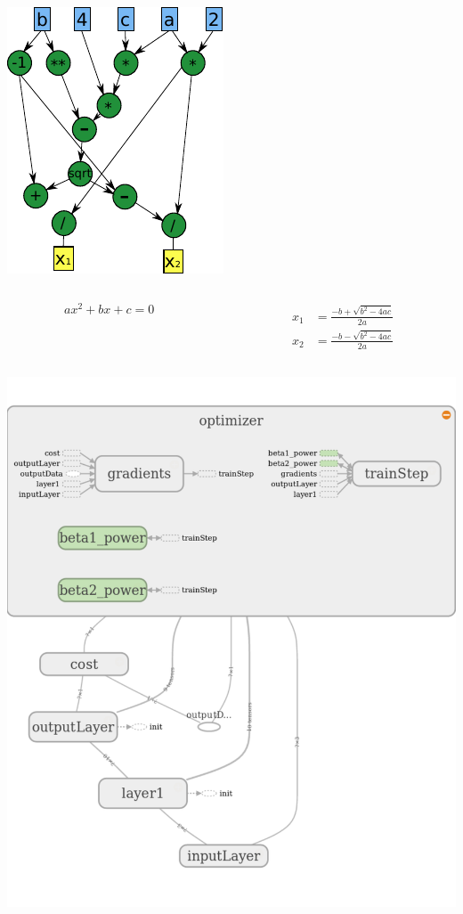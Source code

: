 \documentclass{beamer}
\begin{document}
\begin{frame}
 
\centering
\includegraphics[width=0.4\linewidth]{../Figures/Implementation/DFG.pdf} 

\begin{columns} %
  \begin{column}{0.5\linewidth} %
   \begin{equation*}
    ax^2 + bx + c = 0
   \end{equation*}
  \end{column}
  \begin{column}{0.5\linewidth} %
   \begin{align*}
    x_1 &= \frac{-b + \sqrt{b^2 - 4ac}}{2a}  \label{quadraticEquationSolution1} \\
    x_2 &= \frac{-b - \sqrt{b^2 - 4ac}}{2a}
   \end{align*}
  \end{column}
\end{columns}

\end{frame}


\begin{frame}
 
\centering
\includegraphics[width=0.7\linewidth]{../Figures/Implementation/tensorBoardTraining.pdf} 
 
\end{frame}
\end{document}
